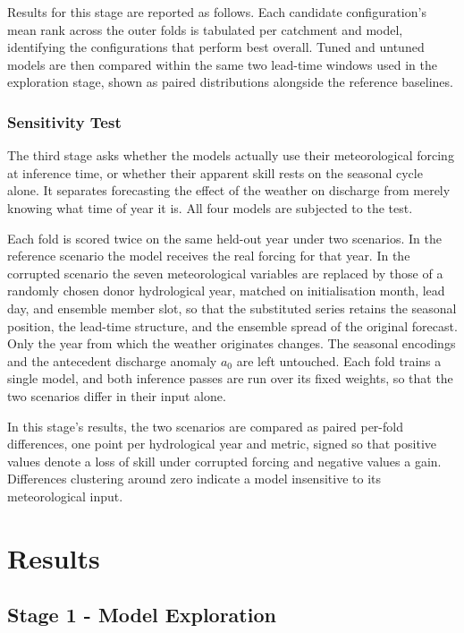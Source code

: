 \documentclass[review,12pt,authoryear]{elsarticle}
\begin{document}
Results for this stage are reported as follows. Each candidate configuration's mean rank across the outer folds is tabulated per catchment and model, identifying the configurations that perform best overall. Tuned and untuned models are then compared within the same two lead-time windows used in the exploration stage, shown as paired distributions alongside the reference baselines.

  \subsubsection{Sensitivity Test}

The third stage asks whether the models actually use their meteorological forcing at inference time, or whether their apparent skill rests on the seasonal cycle alone. It separates forecasting the effect of the weather on discharge from merely knowing what time of year it is. All four models are subjected to the test.

Each fold is scored twice on the same held-out year under two scenarios. In the reference scenario the model receives the real forcing for that year. In the corrupted scenario the seven meteorological variables are replaced by those of a randomly chosen donor hydrological year, matched on initialisation month, lead day, and ensemble member slot, so that the substituted series retains the seasonal position, the lead-time structure, and the ensemble spread of the original forecast. Only the year from which the weather originates changes. The seasonal encodings and the antecedent discharge anomaly $a_{0}$ are left untouched. Each fold trains a single model, and both inference passes are run over its fixed weights, so that the two scenarios differ in their input alone.

In this stage's results, the two scenarios are compared as paired per-fold differences, one point per hydrological year and metric, signed so that positive values denote a loss of skill under corrupted forcing and negative values a gain. Differences clustering around zero indicate a model insensitive to its meteorological input.

\section{Results}
\label{sec:results}

\subsection{Stage 1 - Model Exploration}
\label{sec:results_st1}
\end{document}
